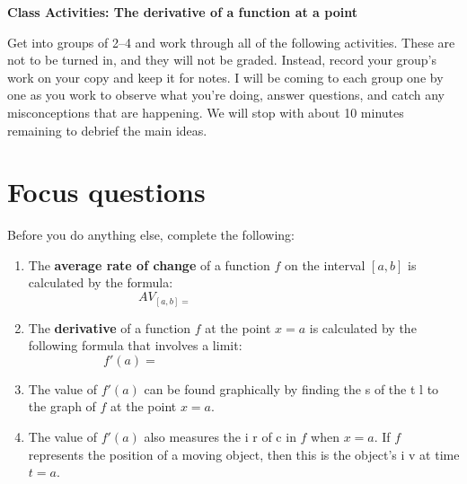 \documentclass[11pt]{article}
\begin{document}
	
	\thispagestyle{empty}
	\renewcommand{\headrulewidth}{0.0pt}
	\thispagestyle{fancy}
	\lfoot{}
	\cfoot{}
	\rfoot{}	
	
	\vspace*{0in}

		\begin{center}
			\begin{large}
			\textbf{Class Activities: The derivative of a function at a point} \\
			\end{large}
		\end{center}
	
Get into groups of 2--4 and work through all of the following activities. These are not to be turned in, and they will not be graded. Instead, record your group's work on your copy and keep it for notes. I will be coming to each group one by one as you work to observe what you're doing, answer questions, and catch any misconceptions that are happening. We will stop with about 10 minutes remaining to debrief the main ideas. 

\section{Focus questions}

Before you do anything else, complete the following: 

\begin{enumerate}
	\item The \textbf{average rate of change} of a function $f$ on the interval $[a,b]$ is calculated by the formula: 
	\[ AV_{[a,b] = \hspace{3in}} \]
	
	
	\item The \textbf{derivative} of a function $f$ at the point $x=a$ is calculated by the following formula that involves a limit: 
	\[ f'(a) = \hspace{3in} \]
	
	\item The value of $f'(a)$ can be found graphically by finding  the s\underline{\hspace{1in}} of the t\underline{\hspace{1in}} l\underline{\hspace{1in}} to the graph of $f$ at the point $x = a$. 
	
	\item The value of $f'(a)$ also measures the i\underline{\hspace{1in}} r\underline{\hspace{1in}} of c\underline{\hspace{1in}} in $f$ when $x=a$. If $f$ represents the position of a moving object, then this is the object's i\underline{\hspace{1in}} v\underline{\hspace{1in}} at time $t=a$. 
		
\end{enumerate}
\end{document}
